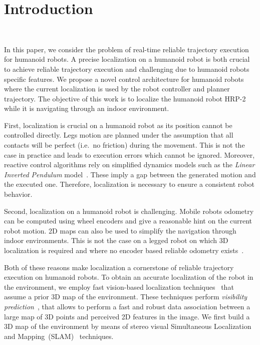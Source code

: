 \section{Introduction}~\label{sec:introduction}

In this paper, we consider the problem of real-time reliable
trajectory execution for humanoid robots. A precise localization on a
humanoid robot is both crucial to achieve reliable trajectory
execution and challenging due to humanoid robots specific features. We
propose a novel control architecture for humanoid robots where the
current localization is used by the robot controller and planner
trajectory. The objective of this work is to localize the humanoid robot
HRP-2~\cite{Kaneko04icra} while it is navigating through an indoor
environment.

First, localization is crucial on a humanoid robot as its position
cannot be controlled directly. Legs motion are planned under the
assumption that all contacts will be perfect (i.e.\ no friction)
during the movement. This is not the case in practice and leads to
execution errors which cannot be ignored. Moreover, reactive control
algorithms rely on simplified dynamics models such as the
\textit{Linear Inverted Pendulum} model~\cite{Kajita01iros}. These
imply a gap between the generated motion and the executed
one. Therefore, localization is necessary to ensure a consistent robot
behavior.

Second, localization on a humanoid robot is challenging. Mobile
robots odometry can be computed using wheel encoders and give a
reasonable hint on the current robot motion. 2D maps can also be used
to simplify the navigation through indoor environments. This is not
the case on a legged robot on which 3D localization is required and
where no encoder based reliable odometry exists~\citep{Hornung10iros}.

Both of these reasons make localization a cornerstone of reliable
trajectory execution on humanoid robots. To obtain an accurate
localization of the robot in the environment, we employ fast
vision-based localization techniques~\cite{Alcantarilla10icra} that
assume a prior 3D map of the environment. These techniques perform
\textit{visibility prediction}~\cite{Alcantarilla11icra}, that allows
to perform a fast and robust data association between a large map of
3D points and perceived 2D features in the image. We first build a
3D map of the environment by means of stereo visual Simultaneous
Localization and Mapping~(SLAM)~\cite{Davison07pami,Konolige08tro}
techniques.

